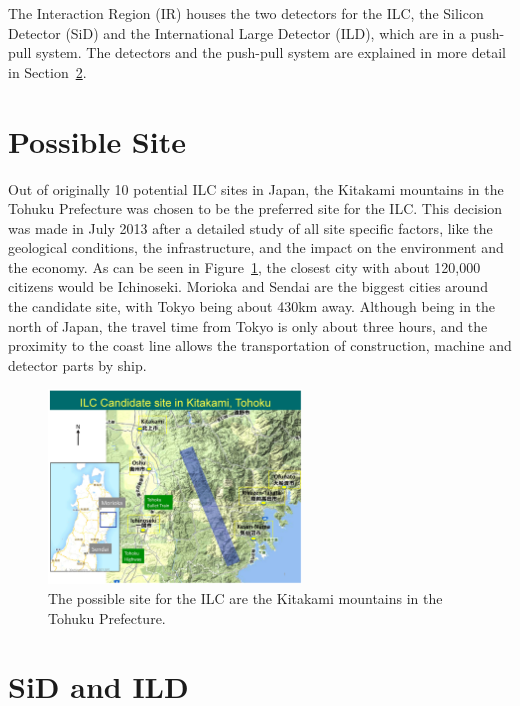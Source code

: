 The Interaction Region (IR) houses the two detectors for the ILC, the Silicon Detector (SiD) and the International Large Detector (ILD), which are in a push-pull system.
The detectors and the push-pull system are explained in more detail in Section~\ref{ILC:detectors}.

\section{Possible Site}
\label{ILC:site}
Out of originally 10 potential ILC sites in Japan, the Kitakami mountains in the Tohuku Prefecture was chosen to be the preferred site for the ILC.
This decision was made in July 2013 after a detailed study of all site specific factors, like the geological conditions, the infrastructure, and the impact on the environment and the economy.
As can be seen in Figure~\ref{fig:ILC_Site}, the closest city with about 120,000 citizens would be Ichinoseki.
Morioka and Sendai are the biggest cities around the candidate site, with Tokyo being about \unit{430}{km} away.
Although being in the north of Japan, the travel time from Tokyo is only about three hours, and the proximity to the coast line allows the transportation of construction, machine and detector parts by ship.

\begin{figure}
\centering
\includegraphics[width=0.6\textwidth]{Figures/ILC-site.jpg}
\caption[Possible site for the ILC]{The possible site for the ILC are the Kitakami mountains in the Tohuku Prefecture.\cite{Site}}
\label{fig:ILC_Site}
\end{figure}

\section{SiD and ILD}
\label{ILC:detectors}

